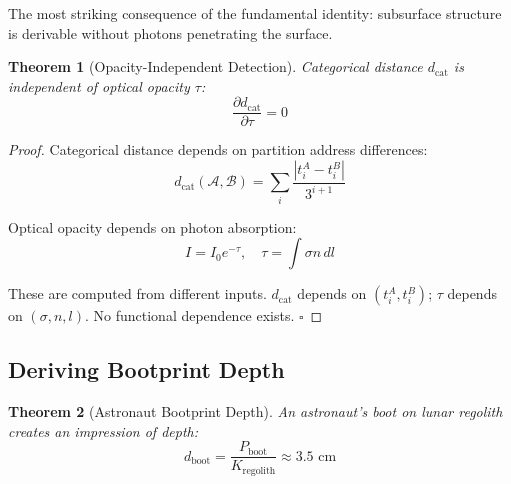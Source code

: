 \documentclass[twocolumn,10pt]{article}
\newtheorem{theorem}{Theorem}[section]
\theoremstyle{definition}
\theoremstyle{remark}
\newcommand{\dcat}{d_{\mathrm{cat}}}
\begin{document}
The most striking consequence of the fundamental identity: subsurface structure is derivable without photons penetrating the surface.

\begin{theorem}[Opacity-Independent Detection]
\label{thm:opacity}
Categorical distance $\dcat$ is independent of optical opacity $\tau$:
\begin{equation}
\frac{\partial \dcat}{\partial \tau} = 0
\end{equation}
\end{theorem}

\begin{proof}
Categorical distance depends on partition address differences:
\begin{equation}
\dcat(\mathcal{A}, \mathcal{B}) = \sum_{i} \frac{|t_i^A - t_i^B|}{3^{i+1}}
\end{equation}

Optical opacity depends on photon absorption:
\begin{equation}
I = I_0 e^{-\tau}, \quad \tau = \int \sigma n \, dl
\end{equation}

These are computed from different inputs. $\dcat$ depends on $(t_i^A, t_i^B)$; $\tau$ depends on $(\sigma, n, l)$. No functional dependence exists. $\square$
\end{proof}

\subsection{Deriving Bootprint Depth}

\begin{theorem}[Astronaut Bootprint Depth]
\label{thm:bootprint}
An astronaut's boot on lunar regolith creates an impression of depth:
\begin{equation}
d_{\text{boot}} = \frac{P_{\text{boot}}}{K_{\text{regolith}}} \approx 3.5 \text{ cm}
\end{equation}
\end{theorem}
\end{document}
